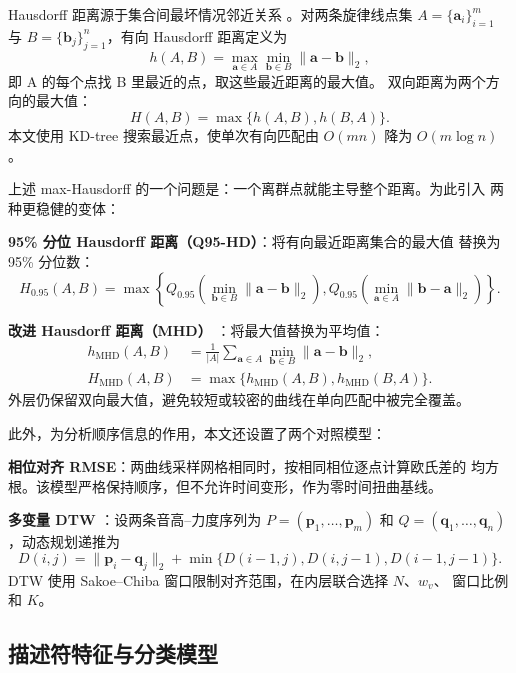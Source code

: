 \documentclass[UTF8,a4paper,12pt]{ctexart}
\newcommand{\MHD}{H_{\mathrm{MHD}}}
\newcommand{\QHD}{H_{0.95}}
\begin{document}
Hausdorff 距离源于集合间最坏情况邻近关系 \cite{hausdorff}。对两条旋律线点集
$A=\{\bm a_i\}_{i=1}^{m}$ 与
$B=\{\bm b_j\}_{j=1}^{n}$，有向 Hausdorff 距离定义为
\begin{equation}
  h(A,B)=\max_{\bm a\in A}\min_{\bm b\in B}\|\bm a-\bm b\|_2,
\end{equation}
即 A 的每个点找 B 里最近的点，取这些最近距离的最大值。
双向距离为两个方向的最大值：
\begin{equation}
  H(A,B)=\max\{h(A,B),h(B,A)\}.
  \label{eq:hd}
\end{equation}
本文使用 KD-tree 搜索最近点，使单次有向匹配由 $O(mn)$ 降为 $O(m\log n)$。

上述 max-Hausdorff 的一个问题是：一个离群点就能主导整个距离。为此引入
两种更稳健的变体：

\textbf{95\% 分位 Hausdorff 距离（Q95-HD）}：将有向最近距离集合的最大值
替换为 95\% 分位数：
\begin{equation}
  \QHD(A,B)=\max\left\{
  Q_{0.95}\!\left(\min_{\bm b\in B}\|\bm a-\bm b\|_2\right),
  Q_{0.95}\!\left(\min_{\bm a\in A}\|\bm b-\bm a\|_2\right)
  \right\}.
\end{equation}

\textbf{改进 Hausdorff 距离（MHD）} \cite{dubuisson}：将最大值替换为平均值：
\begin{align}
  h_{\mathrm{MHD}}(A,B)
  &=\frac{1}{|A|}\sum_{\bm a\in A}
  \min_{\bm b\in B}\|\bm a-\bm b\|_2,\\
  \MHD(A,B)
  &=\max\{h_{\mathrm{MHD}}(A,B),h_{\mathrm{MHD}}(B,A)\}.
  \label{eq:mhd}
\end{align}
外层仍保留双向最大值，避免较短或较密的曲线在单向匹配中被完全覆盖。

此外，为分析顺序信息的作用，本文还设置了两个对照模型：

\textbf{相位对齐 RMSE}：两曲线采样网格相同时，按相同相位逐点计算欧氏差的
均方根。该模型严格保持顺序，但不允许时间变形，作为零时间扭曲基线。

\textbf{多变量 DTW} \cite{dtw}：设两条音高--力度序列为 $P=(\bm p_1,\ldots,\bm p_m)$
和 $Q=(\bm q_1,\ldots,\bm q_n)$，动态规划递推为
\begin{equation}
  D(i,j)=\|\bm p_i-\bm q_j\|_2+
  \min\{D(i-1,j),D(i,j-1),D(i-1,j-1)\}.
\end{equation}
DTW 使用 Sakoe--Chiba 窗口限制对齐范围，在内层联合选择 $N$、$w_v$、
窗口比例和 $K$。

\subsection{描述符特征与分类模型}
\end{document}

